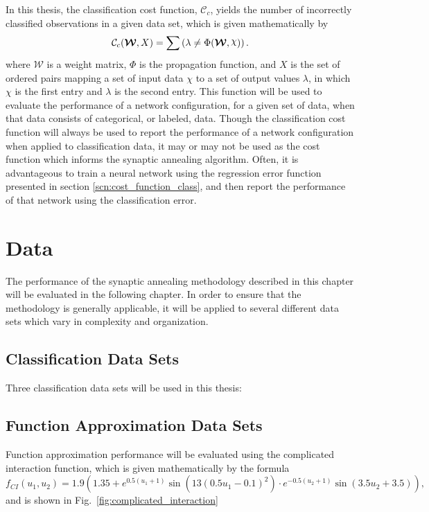 \documentclass[11pt]{afthesis}
\DeclareRobustCommand{\rchi}{{\mathpalette\irchi\relax}}
\newcommand{\irchi}[2]{\raisebox{\depth}{$#1\chi$}}
\begin{document}
	In this thesis, the classification cost function, $\mathcal{C}_c$, yields the number of incorrectly classified observations in a given data set, which is given mathematically by 
	\begin{equation} \label{eq:cost_function_class}
	\mathcal{C}_c(\boldsymbol{\mathcal{W}},X) = \sum \left( \lambda \neq \Phi(\boldsymbol{\mathcal{W}},\rchi) \right).
	\end{equation}
	\noindent where $\boldsymbol{\mathcal{W}}$ is a weight matrix, $\Phi$ is the propagation function, and $X$ is the set of ordered pairs mapping a set of input data $\chi$ to a set of output values $\lambda$, in which $\chi$ is the first entry and $\lambda$ is the second entry. This function will be used to evaluate the performance of a network configuration, for a given set of data, when that data consists of categorical, or labeled, data. Though the classification cost function will always be used to report the performance of a network configuration when applied to classification data, it may or may not be used as the cost function which informs the synaptic annealing algorithm. Often, it is advantageous to train a neural network using the regression error function \cite{haykin1999} presented in section \ref{scn:cost_function_class}, and then report the performance of that network using the classification error. 
	

	
	\section{Data}
	\label{scn:data}
	
	The performance of the synaptic annealing methodology described in this chapter will be evaluated in the following chapter. In order to ensure that the methodology is generally applicable, it will be applied to several different data sets which vary in complexity and organization. 
	
	\subsection{Classification Data Sets}
	Three classification data sets will be used in this thesis: 
	
	\subsection{Function Approximation Data Sets}
	Function approximation performance will be evaluated using the complicated interaction function, which is given mathematically by the formula \begin{equation}
	f_{CI}(u_1,u_2) = 1.9(1.35 + e^{0.5(u_1+1)} \sin ( 13 (0.5 u_1 - 0.1 )^2 ) · e^{−0.5(u_2+1)} \sin(3.5u_2 + 3.5)),
	\end{equation} 
	\noindent and is shown in Fig.~\ref{fig:complicated_interaction}
	
\end{document}
